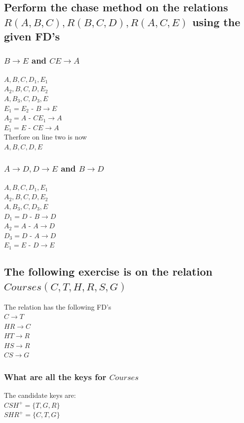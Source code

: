 \documentclass[12pt, a4paper]{article}
\begin{document}
				\subsection{Perform the chase method on the relations $R(A,B,C),R(B,C,D),R(A,C,E)$ using the given FD's}
					\subsubsection{$B\rightarrow E$ and $CE\rightarrow A$}
						$A,B,C,D_1,E_1$\\
						$A_2,B,C,D,E_2$\\
						$A,B_3,C,D_3,E$\\
						$E_1=E_2$ - $B\rightarrow E$\\
						$A_2=A$ - $CE_1 \rightarrow A$\\
						$E_1=E$ - $CE \rightarrow A$\\
						Therfore on line two is now\\
						$A,B,C,D,E$
					\subsubsection{$A\rightarrow D, D\rightarrow E$ and $B\rightarrow D$}
						$A,B,C,D_1,E_1$\\
						$A_2,B,C,D,E_2$\\
						$A,B_3,C,D_3,E$\\
						$D_1=D$ - $B\rightarrow D$\\
						$A_2=A$ - $A\rightarrow D$\\
						$D_3=D$ - $A\rightarrow D$\\
						$E_1=E$ - $D\rightarrow E$
				\subsection{The following exercise is on the relation $Courses(C,T,H,R,S,G)$}
					The relation has the following FD's\\
					$C\rightarrow T$\\
					$HR\rightarrow C$\\
					$HT\rightarrow R$\\
					$HS\rightarrow R$\\
					$CS\rightarrow G$
					\subsubsection{What are all the keys for $Courses$}
						The candidate keys are:\\
						$CSH^+=\{T,G,R\}$\\
						$SHR^+=\{C,T,G\}$
\end{document}
